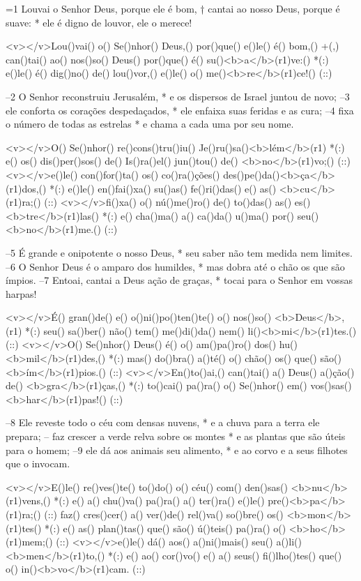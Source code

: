 =1 Louvai o Senhor Deus, porque ele é bom, †
cantai ao nosso Deus, porque é suave: *
ele é digno de louvor, ele o merece!

<v></v>Lou()vai() o() Se()nhor() Deus,() por()que() e()le() é() bom,() +(,)
can()tai() ao() nos()so() Deus() por()que() é() su()<b>a</b>(r1)ve:() *(:)
e()le() é() dig()no() de() lou()vor,() e()le() o() me()<b>re</b>(r1)ce!() (::)

–2 O Senhor reconstruiu Jerusalém, *
e os dispersos de Israel juntou de novo;
–3 ele conforta os corações despedaçados, *
ele enfaixa suas feridas e as cura;
–4 fixa o número de todas as estrelas *
e chama a cada uma por seu nome.

<v></v>O() Se()nhor() re()cons()tru()iu() Je()ru()sa()<b>lém</b>(r1) *(:)
e() os() dis()per()sos() de() Is()ra()el() jun()tou() de() <b>no</b>(r1)vo;() (::)
<v></v>e()le() con()for()ta() os() co()ra()ções() des()pe()da()<b>ça</b>(r1)dos,() *(:)
e()le() en()fai()xa() su()as() fe()ri()das() e() as() <b>cu</b>(r1)ra;() (::)
<v></v>fi()xa() o() nú()me()ro() de() to()das() as() es()<b>tre</b>(r1)las() *(:)
e() cha()ma() a() ca()da() u()ma() por() seu() <b>no</b>(r1)me.() (::)

–5 É grande e onipotente o nosso Deus, *
seu saber não tem medida nem limites.
–6 O Senhor Deus é o amparo dos humildes, *
mas dobra até o chão os que são ímpios.
–7 Entoai, cantai a Deus ação de graças, *
tocai para o Senhor em vossas harpas!

<v></v>É() gran()de() e() o()ni()po()ten()te() o() nos()so() <b>Deus</b>,(r1) *(:)
seu() sa()ber() não() tem() me()di()da() nem() li()<b>mi</b>(r1)tes.() (::)
<v></v>O() Se()nhor() Deus() é() o() am()pa()ro() dos() hu()<b>mil</b>(r1)des,() *(:)
mas() do()bra() a()té() o() chão() os() que() são() <b>ím</b>(r1)pios.() (::)
<v></v>En()to()ai,() can()tai() a() Deus() a()ção() de() <b>gra</b>(r1)ças,() *(:)
to()cai() pa()ra() o() Se()nhor() em() vos()sas() <b>har</b>(r1)pas!() (::)

–8 Ele reveste todo o céu com densas nuvens, *
e a chuva para a terra ele prepara;
– faz crescer a verde relva sobre os montes *
e as plantas que são úteis para o homem;
–9 ele dá aos animais seu alimento, *
e ao corvo e a seus filhotes que o invocam.

<v></v>E()le() re()ves()te() to()do() o() céu() com() den()sas() <b>nu</b>(r1)vens,() *(:)
e() a() chu()va() pa()ra() a() ter()ra() e()le() pre()<b>pa</b>(r1)ra;() (::)
faz() cres()cer() a() ver()de() rel()va() so()bre() os() <b>mon</b>(r1)tes() *(:)
e() as() plan()tas() que() são() ú()teis() pa()ra() o() <b>ho</b>(r1)mem;() (::)
<v></v>e()le() dá() aos() a()ni()mais() seu() a()li()<b>men</b>(r1)to,() *(:)
e() ao() cor()vo() e() a() seus() fi()lho()tes() que() o() in()<b>vo</b>(r1)cam. (::)

